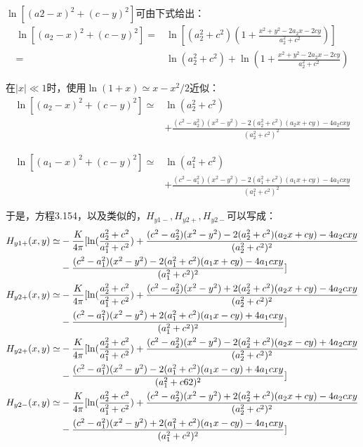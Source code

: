 $\ln[(a2−x)^2+(c−y)^2]$可由下式给出：
\begin{equation*}
\begin{split}
\ln[(a_{2}-x)^{2}+(c-y)^{2}]=&\ln[(a_{2}^{2}+c^{2})(1+\frac{x^{2}+y^{2}-2a_{2}x-2cy}{a_{2}^{2}+c^{2}})]\\
=&\ln(a_{2}^{2}+c^{2})+\ln(1+\frac{x^{2}+y^{2}-2a_{2}x-2cy}{a_{2}^{2}+c^{2}})
\end{split}
\end{equation*}

在$|x|\ll 1$时，使用$\ln(1+x)\simeq x-x^2 /2$近似：
\begin{equation*}
\begin{split}
\ln[(a_{2}-x)^{2}+(c-y)^{2}]\simeq&\ln(a_{2}^{2}+c^{2})\\
&+\frac{(c^{2}-a_{2}^{2})(x^{2}-y^{2})-2(a_{2}^{2}+c^{2})(a_{2}x+cy)-4a_{2}cxy}{(a_{2}^{2}+c^{2})^{2}}
\end{split}
\end{equation*}

\begin{equation*}
\begin{split}
\ln[(a_{1}-x)^{2}+(c-y)^{2}]\simeq&\ln(a_{1}^{2}+c^{2})\\
&+\frac{(c^{2}-a_{1}^{2})(x^{2}-y^{2})-2(a_{1}^{2}+c^{2})(a_{1}x+cy)-4a_{1}cxy}{(a_{1}^{2}+c^{2})^{2}}
\end{split}
\end{equation*}

于是，方程3.154，以及类似的，$H_{y1−}, H_{y2+}, H_{y2−}$可以写成：
\begin{subequations}
	\begin{align}
H_{y1+}(x,y)\simeq&-\frac{K}{4\pi}[\ln(\frac{a_{2}^{2}+c^{2}}{a_{1}^{2}+c^{2}})+\frac{(c^{2}-a_{2}^{2})(x^{2}-y^{2})-2(a_{2}^{2}+c^{2})(a_{2}x+cy)-4a_{2}cxy}{(a_{2}^{2}+c^{2})^{2}}\notag\\
&-\frac{(c^{2}-a_{1}^{2})(x^{2}-y^{2})-2(a_{1}^{2}+c^{2})(a_{1}x+cy)-4a_{1}cxy}{(a_{1}^{2}+c^{2})^{2}}]\\
H_{y2+}(x,y)\simeq&-\frac{K}{4\pi}[\ln(\frac{a_{2}^{2}+c^{2}}{a_{1}^{2}+c^{2}})+\frac{(c^{2}-a_{2}^{2})(x^{2}-y^{2})+2(a_{2}^{2}+c^{2})(a_{2}x+cy)-4a_{2}cxy}{(a_{2}^{2}+c^{2})^{2}}\notag\\
&-\frac{(c^{2}-a_{1}^{2})(x^{2}-y^{2})+2(a_{1}^{2}+c^{2})(a_{1}x-cy)+4a_{1}cxy}{(a_{1}^{2}+c^{2})^{2}}]\\
H_{y2+}(x,y)\simeq&-\frac{K}{4\pi}[\ln(\frac{a_{2}^{2}+c^{2}}{a_{1}^{2}+c^{2}})+\frac{(c^{2}-a_{2}^{2})(x^{2}-y^{2})-2(a_{2}^{2}+c^{2})(a_{2}x-cy)+4a_{2}cxy}{(a_{2}^{2}+c^{2})^{2}}\notag\\
&-\frac{(c^{2}-a_{1}^{2})(x^{2}-y^{2})-2(a_{1}^{2}+c^{2})(a_{1}x-cy)+4a_{1}cxy}{(a_{1}^{2}+c6{2})^{2}}]\\
H_{y2-}(x,y)\simeq&-\frac{K}{4\pi}[\ln(\frac{a_{2}^{2}+c^{2}}{a_{1}^{2}+c^{2}})+\frac{(c^{2}-a_{2}^{2})(x^{2}-y^{2})+2(a_{2}^{2}+c^{2})(a_{2}x+cy)-4a_{2}cxy}{(a_{2}^{2}+c^{2})^{2}}\notag\\
&-\frac{(c^{2}-a_{1}^{2})(x^{2}-y^{2})+2(a_{1}^{2}+c^{2})(a_{1}x-cy)-4a_{1}cxy}{(a_{1}^{2}+c^{2})^{2}}]%
\end{align}
\end{subequations}

